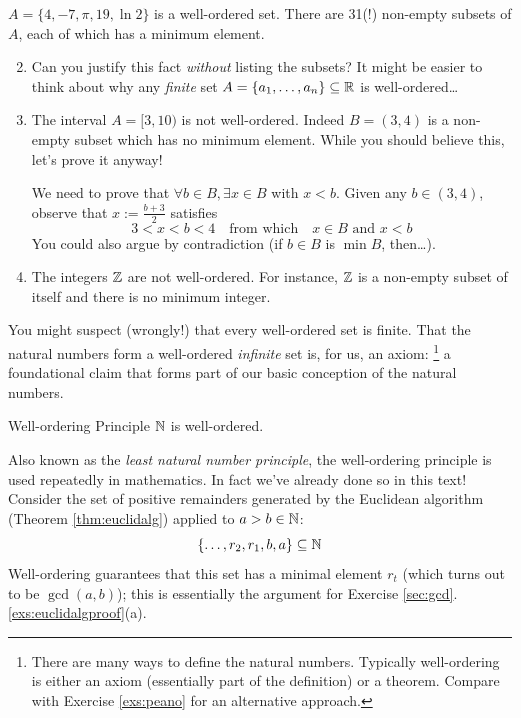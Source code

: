 \begin{examples}{}{}
	\exstart $A=\{4,-7,\pi,19,\ln 2\}$ is a well-ordered set. There are 31(!) non-empty subsets of $A$, each of which has a minimum element.\vspace{-5pt}
	\begin{enumerate}\setcounter{enumi}{1}
	  \item[] Can you justify this fact \emph{without} listing the subsets? It might be easier to think about why any \emph{finite} set $A=\{a_1,\ldots,a_n\}\subseteq\mathbb{R}$ is well-ordered\ldots 
	  
	  \item The interval $A=[3,10)$ is not well-ordered. Indeed $B=(3,4)$ is a non-empty subset which has no minimum element. While you should believe this, let's prove it anyway!\par
	  We need to prove that $\forall b\in B, \exists x\in B$ with $x<b$. Given any $b\in(3,4)$, observe that $x:=\frac{b+3}2$ satisfies
	  \[
	  	3<x<b<4 \quad\text{from which}\quad x\in B\text{ and }x<b
	  \]
	  You could also argue by contradiction (if $b\in B$ is $\min B$, then\ldots).
	  
	  \item The integers $\mathbb{Z}$ are not well-ordered. For instance, $\mathbb{Z}$ is a non-empty subset of itself and there is no minimum integer.
	\end{enumerate}
\end{examples}

You might suspect (wrongly!) that every well-ordered set is finite. That the natural numbers form a well-ordered \emph{infinite} set is, for us, an axiom:
\footnote{There are many ways to define the natural numbers. Typically well-ordering is either an axiom (essentially part of the definition) or a theorem. Compare with Exercise \ref{exs:peano} for an alternative approach.} a foundational claim that forms part of our basic conception of the natural numbers.

\begin{axiom}{Well-ordering Principle}{}
	$\mathbb{N}$ is well-ordered.
\end{axiom}


Also known as the \emph{least natural number principle}, the well-ordering principle is used repeatedly in mathematics. In fact we've already done so in this text! Consider the set of positive remainders generated by the Euclidean algorithm (Theorem \ref{thm:euclidalg}) applied to $a>b\in\mathbb{N}$:
\[
	\{\ldots,r_2,r_1,b,a\}\subseteq\mathbb{N}
\]
Well-ordering guarantees that this set has a minimal element $r_t$ (which turns out to be $\gcd(a,b)$); this is essentially the argument for Exercise \ref*{sec:gcd}.\ref{exs:euclidalgproof}(a).


